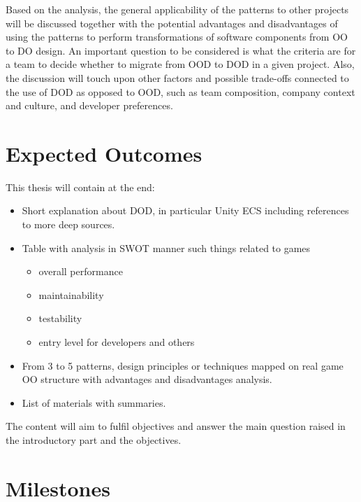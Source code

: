 Based on the analysis, the general applicability of the patterns to other projects will be discussed together with the potential advantages and disadvantages of using the patterns to perform transformations of software components from OO to DO design. An important question to be considered is what the criteria are for a team to decide whether to migrate from OOD to DOD in a given project. Also, the discussion will touch upon other factors and possible trade-offs connected to the use of DOD as opposed to OOD, such as team composition, company context and culture, and developer preferences.


\section{Expected Outcomes}
\label{sec:objectives}
This thesis will contain at the end:


\begin{itemize}
\item Short explanation about DOD, in particular Unity ECS including references to more deep sources. 
\item Table with analysis in SWOT manner such things related to games
\begin{itemize}
\item overall performance
\item maintainability
\item testability
\item entry level for developers and others

\end{itemize}
\item From 3 to 5 patterns, design principles or techniques mapped on real game OO structure with advantages and disadvantages analysis.
\item List of materials with summaries.
\end{itemize}

The content will aim to fulfil objectives and answer the main question raised in the introductory part and the objectives.

\section{Milestones}
\label{sec:objectives}

